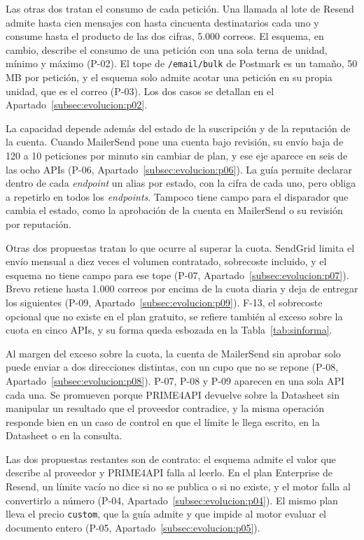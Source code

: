 Las otras dos tratan el consumo de cada petición.
Una llamada al lote de Resend admite hasta cien mensajes con hasta cincuenta destinatarios cada uno y consume hasta el producto de las dos cifras, 5.000 correos.
El esquema, en cambio, describe el consumo de una petición con una sola terna de unidad, mínimo y máximo (P-02).
El tope de \texttt{/email/bulk} de Postmark es un tamaño, 50 MB por petición, y el esquema solo admite acotar una petición en su propia unidad, que es el correo (P-03).
Los dos casos se detallan en el Apartado~\ref{subsec:evolucion:p02}.

La capacidad depende además del estado de la suscripción y de la reputación de la cuenta.
Cuando MailerSend pone una cuenta bajo revisión, su envío baja de 120 a 10 peticiones por minuto sin cambiar de plan, y ese eje aparece en seis de las ocho APIs (P-06, Apartado~\ref{subsec:evolucion:p06}).
La guía permite declarar dentro de cada \textit{endpoint} un alias por estado, con la cifra de cada uno, pero obliga a repetirlo en todos los \textit{endpoints}.
Tampoco tiene campo para el disparador que cambia el estado, como la aprobación de la cuenta en MailerSend o su revisión por reputación.

Otras dos propuestas tratan lo que ocurre al superar la cuota.
SendGrid limita el envío mensual a diez veces el volumen contratado, sobrecoste incluido, y el esquema no tiene campo para ese tope (P-07, Apartado~\ref{subsec:evolucion:p07}).
Brevo retiene hasta 1.000 correos por encima de la cuota diaria y deja de entregar los siguientes (P-09, Apartado~\ref{subsec:evolucion:p09}).
F-13, el sobrecoste opcional que no existe en el plan gratuito, se refiere también al exceso sobre la cuota en cinco APIs, y su forma queda esbozada en la Tabla~\ref{tab:sinforma}.

Al margen del exceso sobre la cuota, la cuenta de MailerSend sin aprobar solo puede enviar a dos direcciones distintas, con un cupo que no se repone (P-08, Apartado~\ref{subsec:evolucion:p08}).
P-07, P-08 y P-09 aparecen en una sola API cada una.
Se promueven porque PRIME4API devuelve sobre la Datasheet sin manipular un resultado que el proveedor contradice, y la misma operación responde bien en un caso de control en que el límite le llega escrito, en la Datasheet o en la consulta.

Las dos propuestas restantes son de contrato: el esquema admite el valor que describe al proveedor y PRIME4API falla al leerlo.
En el plan Enterprise de Resend, un límite vacío no dice si no se publica o si no existe, y el motor falla al convertirlo a número (P-04, Apartado~\ref{subsec:evolucion:p04}).
El mismo plan lleva el precio \texttt{custom}, que la guía admite y que impide al motor evaluar el documento entero (P-05, Apartado~\ref{subsec:evolucion:p05}).


